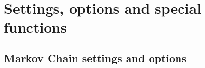 \documentclass[11pt, a4paper]{article}
\begin{document}

\section{Settings, options and special functions}
\label{section:settings}


\subsection{Markov Chain settings and options}
\label{section:settings:MCMC}
\end{document}
